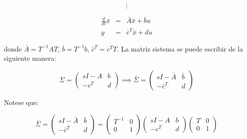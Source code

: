 \begin{enumerate}[i)]
\begin{enumerate}[a)]
                \begin{equation}
                    \vdots \nonumber
                \end{equation}

                \begin{eqnarray}
                \frac{d}{dt} \bar{x} & = & \bar{A} \bar{x} + \bar{b} u \nonumber \\
                y & = & \bar{c}^T \bar{x} + d u
                \end{eqnarray}

                donde $\bar{A} = T^{-1} A T$, $\bar{b} = T^{-1} b$, $\bar{c}^T = c^T T$. La matriz sistema se puede escribir de la siguiente manera:

                \begin{equation}
                    \Sigma =
                    \begin{pmatrix}
                    sI - A & b \\
                    -c^T & d
                    \end{pmatrix}
                    \implies
                    \bar{\Sigma} =
                    \begin{pmatrix}
                    sI - \bar{A} & \bar{b} \\
                    -\bar{c}^T & d
                    \end{pmatrix}
                \end{equation}

                Notese que:

                \begin{equation}
                    \bar{\Sigma} =
                    \begin{pmatrix}
                    sI - \bar{A} & \bar{b} \\
                    -\bar{c}^T & d
                    \end{pmatrix} =
                    \begin{pmatrix}
                    T^{-1} & 0 \\
                    0 & 1
                    \end{pmatrix}
                    \begin{pmatrix}
                    sI - A & b \\
                    -c^T & d
                    \end{pmatrix}
                    \begin{pmatrix}
                    T & 0 \\
                    0 & 1
                    \end{pmatrix} \nonumber
                \end{equation}


\end{enumerate}
\end{enumerate}
